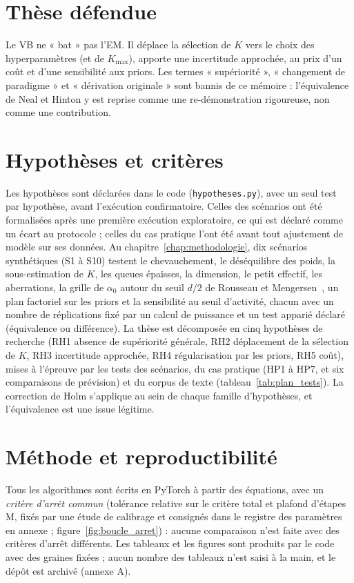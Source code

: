 \section*{Thèse défendue}
Le VB ne « bat » pas l'EM. Il déplace la sélection de $K$ vers le choix des hyperparamètres (et de $K_{\max}$), apporte une incertitude approchée, au prix d'un coût et d'une sensibilité aux priors. Les termes « supériorité », « changement de paradigme » et « dérivation originale » sont bannis de ce mémoire : l'équivalence de Neal et Hinton y est reprise comme une re-démonstration rigoureuse, non comme une contribution.

\section*{Hypothèses et critères}
Les hypothèses sont déclarées dans le code (\texttt{hypotheses.py}), avec un seul test par hypothèse, avant l'exécution confirmatoire. Celles des scénarios ont été formalisées après une première exécution exploratoire, ce qui est déclaré comme un écart au protocole ; celles du cas pratique l'ont été avant tout ajustement de modèle sur ses données. Au chapitre~\ref{chap:methodologie}, dix scénarios synthétiques (S1 à S10) testent le chevauchement, le déséquilibre des poids, la sous-estimation de $K$, les queues épaisses, la dimension, le petit effectif, les aberrations, la grille de $\alpha_0$ autour du seuil $d/2$ de Rousseau et Mengersen~\cite{rousseau2011}, un plan factoriel sur les priors et la sensibilité au seuil d'activité, chacun avec un nombre de réplications fixé par un calcul de puissance et un test apparié déclaré (équivalence ou différence). La thèse est décomposée en cinq hypothèses de recherche (RH1 absence de supériorité générale, RH2 déplacement de la sélection de $K$, RH3 incertitude approchée, RH4 régularisation par les priors, RH5 coût), mises à l'épreuve par les tests des scénarios, du cas pratique (HP1 à HP7, et six comparaisons de prévision) et du corpus de texte (tableau~\ref{tab:plan_tests}). La correction de Holm s'applique au sein de chaque famille d'hypothèses, et l'équivalence est une issue légitime.

\section*{Méthode et reproductibilité}
Tous les algorithmes sont écrits en PyTorch à partir des équations, avec un \emph{critère d'arrêt commun} (tolérance relative sur le critère total et plafond d'étapes M, fixés par une étude de calibrage et consignés dans le registre des paramètres en annexe ; figure~\ref{fig:boucle_arret}) : aucune comparaison n'est faite avec des critères d'arrêt différents. Les tableaux et les figures sont produits par le code avec des graines fixées ; aucun nombre des tableaux n'est saisi à la main, et le dépôt est archivé (annexe A).

